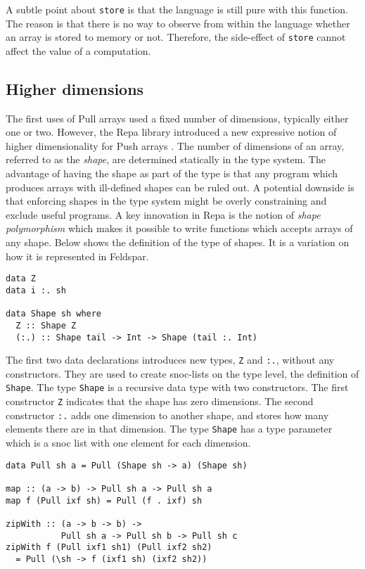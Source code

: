 \documentclass{sigplanconf}
\begin{document}
A subtle point about \verb!store! is that the language is still pure
with this function. The reason is that there is no way to observe from
within the language whether an array is stored to memory or
not. Therefore, the side-effect of \verb!store! cannot affect the
value of a computation.

\subsection{Higher dimensions}

The first uses of Pull arrays used a fixed number of dimensions,
typically either one or two. However, the Repa library introduced a
new expressive notion of higher dimensionality for Push arrays
\cite{keller2010regular}. The number of dimensions of an array, referred
to as the \emph{shape}, are determined statically in the type
system. The advantage of having the shape as part of the type is that
any program which produces arrays with ill-defined shapes can be ruled
out. A potential downside is that enforcing shapes in the type system might
be overly constraining and exclude useful programs. A key innovation in
Repa is the notion of \emph{shape polymorphism} which makes it
possible to write functions which accepts arrays of any shape. Below
shows the definition of the type of shapes. It is a variation on how
it is represented in Feldspar.

\begin{verbatim}
data Z
data i :. sh

data Shape sh where
  Z :: Shape Z
  (:.) :: Shape tail -> Int -> Shape (tail :. Int)
\end{verbatim}

The first two data declarations introduces new types, \verb!Z! and
\verb!:.!, without any constructors. They are used to create
snoc-lists on the type level, the definition of \verb!Shape!.  The
type \verb!Shape! is a recursive data type with two constructors. The
first constructor \verb!Z! indicates that the shape has zero
dimensions.  The second constructor \verb!:.! adds one dimension to
another shape, and stores how many elements there are in that
dimension. The type \verb!Shape! has a type parameter which is a snoc
list with one element for each dimension.

\begin{verbatim}
data Pull sh a = Pull (Shape sh -> a) (Shape sh)

map :: (a -> b) -> Pull sh a -> Pull sh a
map f (Pull ixf sh) = Pull (f . ixf) sh

zipWith :: (a -> b -> b) -> 
           Pull sh a -> Pull sh b -> Pull sh c
zipWith f (Pull ixf1 sh1) (Pull ixf2 sh2)
  = Pull (\sh -> f (ixf1 sh) (ixf2 sh2))
\end{verbatim}
\end{document}
